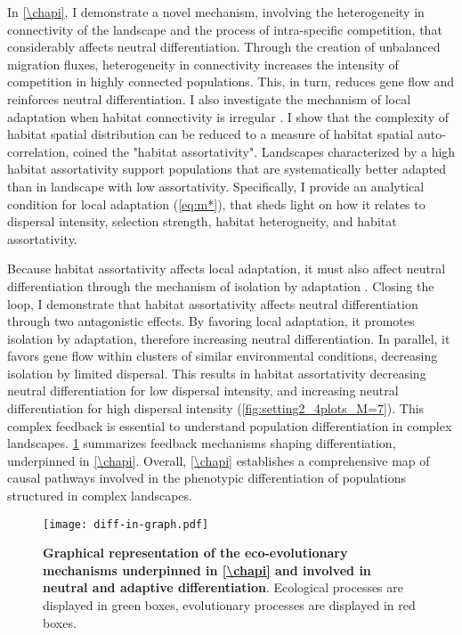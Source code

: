 In \cref{\chapi}, I demonstrate a novel mechanism, involving the heterogeneity in connectivity of the landscape and the process of intra-specific competition, that considerably affects neutral differentiation. Through the creation of unbalanced migration fluxes, heterogeneity in connectivity increases the intensity of competition in highly connected populations. This, in turn, reduces gene flow and reinforces neutral differentiation.
% 
I also investigate the mechanism of local adaptation when habitat connectivity is irregular \citep{Dale2010,LiebermanHauert2005}. I show that the complexity of habitat spatial distribution can be reduced to a measure of habitat spatial auto-correlation, coined the "habitat assortativity". Landscapes characterized by a high habitat assortativity support populations that are systematically better adapted than in landscape with low assortativity. Specifically, I provide an analytical condition for local adaptation  (\cref{eq:m*}), that sheds light on how it relates to dispersal intensity, selection strength, habitat heterogneity, and habitat assortativity.

Because habitat assortativity affects local adaptation, it must also affect neutral differentiation through the mechanism of isolation by adaptation \citep{Orsini2013}. Closing the loop, I demonstrate that habitat assortativity affects neutral differentiation through two antagonistic effects. By favoring local adaptation, it promotes isolation by adaptation, therefore increasing neutral differentiation. In parallel, it favors gene flow within clusters of similar environmental conditions, decreasing isolation by limited dispersal. This results in habitat assortativity decreasing neutral differentiation for low dispersal intensity, and increasing neutral differentiation for high dispersal intensity (\cref{fig:setting2_4plots_M=7}).
% 
This complex feedback is essential to understand population differentiation in complex landscapes.
% 
\cref{fig:summary_diff-in-graph} summarizes feedback mechanisms shaping differentiation, underpinned in \cref{\chapi}. Overall, \cref{\chapi} establishes a comprehensive map of causal pathways involved in the phenotypic differentiation of populations structured in complex landscapes. 

\begin{figure}[t]
    \centering
    \texttt{[image: diff-in-graph.pdf]}
    \caption{\textbf{Graphical representation of the eco-evolutionary mechanisms underpinned in \cref{\chapi} and involved in neutral and adaptive differentiation}. Ecological processes are displayed in green boxes, evolutionary processes are displayed in red boxes.}
    \label{fig:summary_diff-in-graph}
\end{figure}


